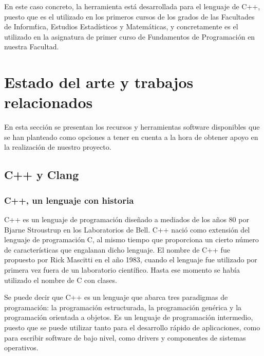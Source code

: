 En este caso concreto, la herramienta est\'a desarrollada para el lenguaje de C++, puesto que es el utilizado en los primeros cursos de los grados de las Facultades de Inform\'tica, Estudios Estad\'isticos y Matem\'aticas, y concretamente es el utilizado en la asignatura de primer curso de Fundamentos de Programaci\'on en nuestra Facultad.

\section{Estado del arte y trabajos relacionados}

En esta secci\'on se presentan los recursos y herramientas software disponibles que se han planteado como opciones a tener en cuenta a la hora de obtener apoyo en la realizaci\'on de nuestro proyecto.

\subsection{C++ y Clang}

\subsubsection*{C++, un lenguaje con historia}
\label{ap2:sec:c++}

C++ es un lenguaje de programaci\'on dise\~nado a mediados de los a\~nos 80 por Bjarne Stroustrup en los Laboratorios de Bell. C++ naci\'o como extensi\'on del lenguaje de programaci\'on C, al mismo tiempo que proporciona un cierto n\'umero de caracter\'isticas que engalanan dicho lenguaje. El nombre de C++ fue propuesto por Rick Mascitti en el a\~no 1983, cuando el lenguaje fue utilizado por primera vez fuera de un laboratorio cient\'ifico. Hasta ese momento se hab\'ia utilizado el nombre de C con clases. 

Se puede decir que C++ es un lenguaje que abarca tres paradigmas de programaci\'on: la programaci\'on estructurada, la programaci\'on gen\'erica y la programaci\'on orientada a objetos. Es un lenguaje de programaci\'on intermedio, puesto que se puede utilizar tanto para el desarrollo r\'apido de aplicaciones, como para escribir software de bajo nivel, como drivers y componentes de sistemas operativos.

